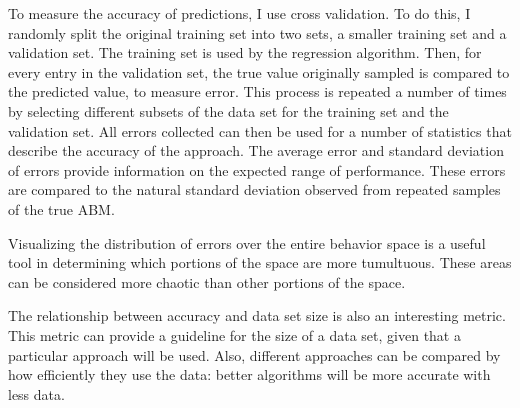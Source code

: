 To measure the accuracy of predictions, I use cross validation.
To do this, I randomly split the original training set into two sets, a smaller training set and a validation set.
The training set is used by the regression algorithm.
Then, for every entry in the validation set, the true value originally sampled is compared to the predicted value, to measure error.
This process is repeated a number of times by selecting different subsets of the data set for the training set and the validation set.
All errors collected can then be used for a number of statistics that describe the accuracy of the approach.
The average error and standard deviation of errors provide information on the expected range of performance.
These errors are compared to the natural standard deviation observed from repeated samples of the true ABM. 

Visualizing the distribution of errors over the entire behavior space is a useful tool in determining which portions of the space are more tumultuous.
These areas can be considered more chaotic than other portions of the space.

The relationship between accuracy and data set size is also an interesting metric.
This metric can provide a guideline for the size of a data set, given that a particular approach will be used.
Also, different approaches can be compared by how efficiently they use the data: better algorithms will be more accurate with less data.





